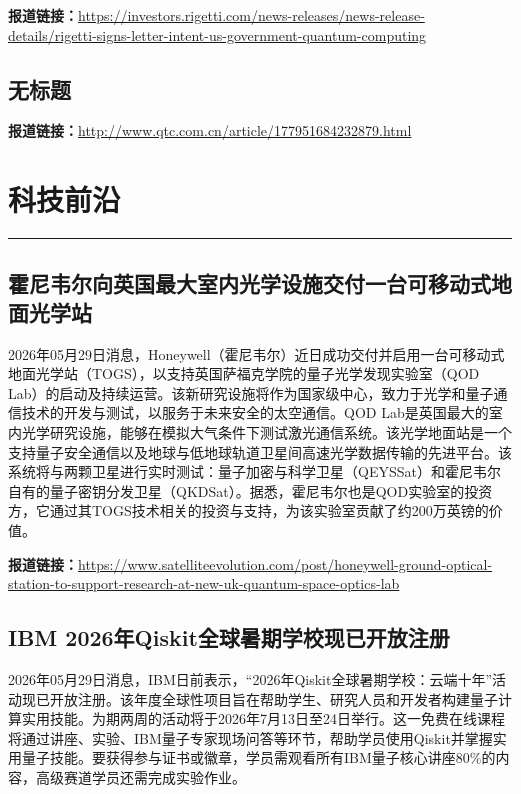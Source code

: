 \documentclass[12pt,a4paper]{ctexart}
\begin{document}
\noindent\textbf{报道链接：}\url{https://investors.rigetti.com/news-releases/news-release-details/rigetti-signs-letter-intent-us-government-quantum-computing}

\subsection{ 无标题 }



\noindent\textbf{报道链接：}\url{http://www.qtc.com.cn/article/177951684232879.html}


\newpage
\section{科技前沿}
\vspace{-0.5em}
\noindent\rule{\linewidth}{1.5pt}

\subsection{ 霍尼韦尔向英国最大室内光学设施交付一台可移动式地面光学站 }

2026年05月29日消息，Honeywell（霍尼韦尔）近日成功交付并启用一台可移动式地面光学站（TOGS），以支持英国萨福克学院的量子光学发现实验室（QOD Lab）的启动及持续运营。该新研究设施将作为国家级中心，致力于光学和量子通信技术的开发与测试，以服务于未来安全的太空通信。QOD Lab是英国最大的室内光学研究设施，能够在模拟大气条件下测试激光通信系统。该光学地面站是一个支持量子安全通信以及地球与低地球轨道卫星间高速光学数据传输的先进平台。该系统将与两颗卫星进行实时测试：量子加密与科学卫星（QEYSSat）和霍尼韦尔自有的量子密钥分发卫星（QKDSat）。据悉，霍尼韦尔也是QOD实验室的投资方，它通过其TOGS技术相关的投资与支持，为该实验室贡献了约200万英镑的价值。

\noindent\textbf{报道链接：}\url{https://www.satelliteevolution.com/post/honeywell-ground-optical-station-to-support-research-at-new-uk-quantum-space-optics-lab}

\subsection{ IBM 2026年Qiskit全球暑期学校现已开放注册 }

2026年05月29日消息，IBM日前表示，“2026年Qiskit全球暑期学校：云端十年”活动现已开放注册。该年度全球性项目旨在帮助学生、研究人员和开发者构建量子计算实用技能。为期两周的活动将于2026年7月13日至24日举行。这一免费在线课程将通过讲座、实验、IBM量子专家现场问答等环节，帮助学员使用Qiskit并掌握实用量子技能。要获得参与证书或徽章，学员需观看所有IBM量子核心讲座80\%的内容，高级赛道学员还需完成实验作业。
\end{document}
